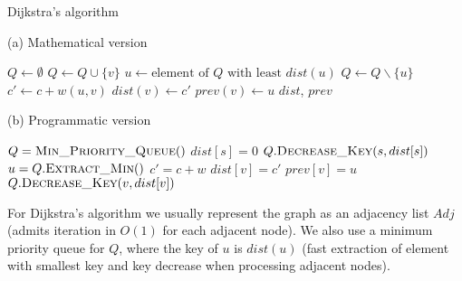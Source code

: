 \documentclass{report}[a4paper]
\theoremstyle{remark}
\begin{document}
\begin{center}
    \begin{algorithm}[ht]
        \caption{Dijkstra's algorithm}
        \label{alg-dijkstra}
        \begin{minipage}[t]{0.49\linewidth}
            (a) Mathematical version
            \begin{algorithmic}[1]
                    \State $Q \gets \emptyset$
                        \State $Q \gets Q \cup \{v\}$
                    \EndFor
                        \State $u \gets \text{element of } Q \text{ with least } dist(u)$
                        \State $Q \gets Q \backslash \{u\}$
                            \State $c' \gets c + w(u, v)$
                                \State $dist(v) \gets c'$
                                \State $prev(v) \gets u$
                            \EndIf
                        \EndFor
                    \EndWhile
                    \State \Return $dist$, $prev$
                \EndFunction
            \end{algorithmic}
        \end{minipage}
        \begin{minipage}[t]{0.49\linewidth}
            (b) Programmatic version
            \begin{algorithmic}[1]
                    \State $Q = \Call{Min\_Priority\_Queue}{ }$
                    \EndFor
                    \State $dist[s] = 0$
                    \State $Q.\Call{Decrease\_Key}{s, dist[s]}$
                        \State $u = Q.\Call{Extract\_Min}{ }$
                            \State $c' = c + w$
                                \State $dist[v] = c'$
                                \State $prev[v] = u$
                                \State $Q.\Call{Decrease\_Key}{v, dist[v]}$
                            \EndIf
                        \EndFor
                    \EndWhile
                    \State {}
                \EndFunction
            \end{algorithmic}
        \end{minipage}
    \end{algorithm}
\end{center}
For Dijkstra's algorithm we usually represent the graph as an adjacency list $Adj$ (admits iteration in $O(1)$ for each adjacent node). We also use a minimum priority queue for $Q$, where the key of $u$ is $dist(u)$ (fast extraction of element with smallest key and key decrease when processing adjacent nodes).
\end{document}
